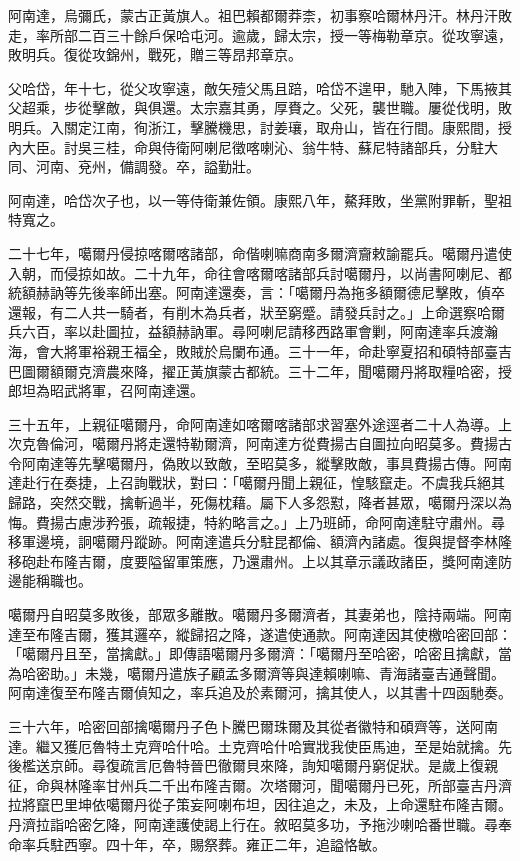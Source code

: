 \begin{pinyinscope}
阿南達，烏彌氏，蒙古正黃旗人。祖巴賴都爾莽柰，初事察哈爾林丹汗。林丹汗敗走，率所部二百三十餘戶保哈屯河。逾歲，歸太宗，授一等梅勒章京。從攻寧遠，敗明兵。復從攻錦州，戰死，贈三等昂邦章京。

父哈岱，年十七，從父攻寧遠，敵矢殪父馬且踣，哈岱不遑甲，馳入陣，下馬掖其父超乘，步從擊敵，與俱還。太宗嘉其勇，厚賚之。父死，襲世職。屢從伐明，敗明兵。入關定江南，徇浙江，擊騰機思，討姜瓖，取舟山，皆在行間。康熙間，授內大臣。討吳三桂，命與侍衛阿喇尼徵喀喇沁、翁牛特、蘇尼特諸部兵，分駐大同、河南、兗州，備調發。卒，謚勤壯。

阿南達，哈岱次子也，以一等侍衛兼佐領。康熙八年，鰲拜敗，坐黨附罪斬，聖祖特寬之。

二十七年，噶爾丹侵掠喀爾喀諸部，命偕喇嘛商南多爾濟齎敕諭罷兵。噶爾丹遣使入朝，而侵掠如故。二十九年，命往會喀爾喀諸部兵討噶爾丹，以尚書阿喇尼、都統額赫訥等先後率師出塞。阿南達還奏，言：「噶爾丹為拖多額爾德尼擊敗，偵卒還報，有二人共一騎者，有削木為兵者，狀至窮蹙。請發兵討之。」上命選察哈爾兵六百，率以赴圖拉，益額赫訥軍。尋阿喇尼請移西路軍會剿，阿南達率兵渡瀚海，會大將軍裕親王福全，敗賊於烏闌布通。三十一年，命赴寧夏招和碩特部臺吉巴圖爾額爾克濟農來降，擢正黃旗蒙古都統。三十二年，聞噶爾丹將取糧哈密，授郎坦為昭武將軍，召阿南達還。

三十五年，上親征噶爾丹，命阿南達如喀爾喀諸部求習塞外途逕者二十人為導。上次克魯倫河，噶爾丹將走還特勒爾濟，阿南達方從費揚古自圖拉向昭莫多。費揚古令阿南達等先擊噶爾丹，偽敗以致敵，至昭莫多，縱擊敗敵，事具費揚古傳。阿南達赴行在奏捷，上召詢戰狀，對曰：「噶爾丹聞上親征，惶駭竄走。不虞我兵絕其歸路，突然交戰，擒斬過半，死傷枕藉。屬下人多怨懟，降者甚眾，噶爾丹深以為悔。費揚古慮涉矜張，疏報捷，特約略言之。」上乃班師，命阿南達駐守肅州。尋移軍邊境，詗噶爾丹蹤跡。阿南達遣兵分駐昆都倫、額濟內諸處。復與提督李林隆移砲赴布隆吉爾，度要隘留軍策應，乃還肅州。上以其章示議政諸臣，獎阿南達防邊能稱職也。

噶爾丹自昭莫多敗後，部眾多離散。噶爾丹多爾濟者，其妻弟也，陰持兩端。阿南達至布隆吉爾，獲其邏卒，縱歸招之降，遂遣使通款。阿南達因其使檄哈密回部：「噶爾丹且至，當擒獻。」即傳語噶爾丹多爾濟：「噶爾丹至哈密，哈密且擒獻，當為哈密助。」未幾，噶爾丹遣族子顧孟多爾濟等與達賴喇嘛、青海諸臺吉通聲聞。阿南達復至布隆吉爾偵知之，率兵追及於素爾河，擒其使人，以其書十四函馳奏。

三十六年，哈密回部擒噶爾丹子色卜騰巴爾珠爾及其從者徽特和碩齊等，送阿南達。繼又獲厄魯特土克齊哈什哈。土克齊哈什哈實戕我使臣馬迪，至是始就擒。先後檻送京師。尋復疏言厄魯特晉巴徹爾貝來降，詢知噶爾丹窮促狀。是歲上復親征，命與林隆率甘州兵二千出布隆吉爾。次塔爾河，聞噶爾丹已死，所部臺吉丹濟拉將竄巴里坤依噶爾丹從子策妄阿喇布坦，因往追之，未及，上命還駐布隆吉爾。丹濟拉詣哈密乞降，阿南達護使謁上行在。敘昭莫多功，予拖沙喇哈番世職。尋奉命率兵駐西寧。四十年，卒，賜祭葬。雍正二年，追謚恪敏。


\end{pinyinscope}
